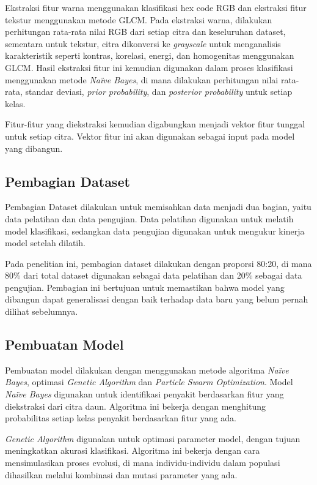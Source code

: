 Ekstraksi fitur warna menggunakan klasifikasi hex code RGB dan ekstraksi fitur tekstur menggunakan metode GLCM. Pada ekstraksi warna, dilakukan perhitungan rata-rata nilai RGB dari setiap citra dan keseluruhan dataset, sementara untuk tekstur, citra dikonversi ke \textit{grayscale} untuk menganalisis karakteristik seperti kontras, korelasi, energi, dan homogenitas menggunakan GLCM. Hasil ekstraksi fitur ini kemudian digunakan dalam proses klasifikasi menggunakan metode \textit{Naïve Bayes}, di mana dilakukan perhitungan nilai rata-rata, standar deviasi, \textit{prior probability}, dan \textit{posterior probability} untuk setiap kelas.

Fitur-fitur yang diekstraksi kemudian digabungkan menjadi vektor fitur tunggal untuk setiap citra. Vektor fitur ini akan digunakan sebagai input pada model yang dibangun.

\subsection{Pembagian Dataset} \label{III.Pembagian Dataset}
Pembagian Dataset dilakukan untuk memisahkan data menjadi dua bagian, yaitu data pelatihan dan data pengujian. Data pelatihan digunakan untuk melatih model klasifikasi, sedangkan data pengujian digunakan untuk mengukur kinerja model setelah dilatih.

Pada penelitian ini, pembagian dataset dilakukan dengan proporsi 80:20, di mana 80\% dari total dataset digunakan sebagai data pelatihan dan 20\% sebagai data pengujian. Pembagian ini bertujuan untuk memastikan bahwa model yang dibangun dapat generalisasi dengan baik terhadap data baru yang belum pernah dilihat sebelumnya.

\subsection{Pembuatan Model} \label{III.Pembuatan Model}
Pembuatan model dilakukan dengan menggunakan metode algoritma \textit{Naïve Bayes}, optimasi \textit{Genetic Algorithm} dan \textit{Particle Swarm Optimization}. Model \textit{Naïve Bayes} digunakan untuk identifikasi penyakit berdasarkan fitur yang diekstraksi dari citra daun. Algoritma ini bekerja dengan menghitung probabilitas setiap kelas penyakit berdasarkan fitur yang ada.

\textit{Genetic Algorithm} digunakan untuk optimasi parameter model, dengan tujuan meningkatkan akurasi klasifikasi. Algoritma ini bekerja dengan cara mensimulasikan proses evolusi, di mana individu-individu dalam populasi dihasilkan melalui kombinasi dan mutasi parameter yang ada.


